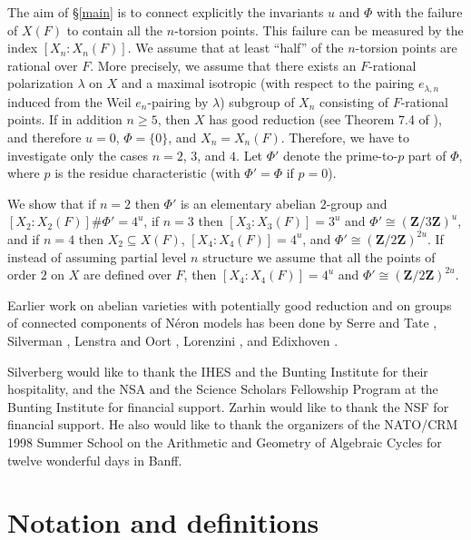 \documentclass{amsart}
\def\Z{{\mathbf Z}}
\theoremstyle{definition}
\begin{document}
The aim of \S\ref{main} is to connect explicitly the invariants 
$u$ and $\Phi$ with the failure of $X(F)$ to contain all the 
$n$-torsion points. This failure can be
measured by the index $[X_n:X_n(F)]$. We assume that at 
least ``half'' of the
$n$-torsion points are rational over $F$. More precisely, we assume that 
there exists an $F$-rational polarization $\lambda$ on $X$ 
and a maximal isotropic 
(with respect to the pairing $e_{\lambda,n}$ induced from the 
Weil $e_n$-pairing by $\lambda$) 
subgroup of $X_n$ consisting of $F$-rational points.
If in addition $n \ge 5$, then $X$ has good reduction (see Theorem 7.4 
of \cite{semistab}), and therefore $u = 0$, $\Phi=\{0\}$, and $X_n=X_n(F)$. 
Therefore, we have to investigate only the cases $n = 2$, $3$, and $4$.
Let $\Phi'$ denote the prime-to-$p$ part of $\Phi$, where $p$ is the
residue characteristic (with $\Phi ' = \Phi$ if $p = 0$). 

We show that if $n = 2$ then $\Phi'$ is an elementary abelian
$2$-group and  $[X_2:X_2(F)]\#\Phi' = 4^{u}$, 
if $n = 3$ then $[X_3:X_3(F)] = 3^{u}$ and
$\Phi' \cong (\Z/3\Z)^u$, and
if $n = 4$ then $X_2 \subseteq X(F)$,
$[X_4:X_4(F)] = 4^{u}$, and $\Phi' \cong (\Z/2\Z)^{2u}$.
If instead of assuming partial level $n$ structure we assume that 
all the points of order $2$ on $X$ are defined over $F$, then
$[X_4:X_4(F)]=4^u$ and $\Phi' \cong (\Z/2\Z)^{2u}$. 

Earlier work on abelian varieties with potentially good reduction and
on groups of connected components of N\'eron models 
has been done by Serre and Tate \cite{Serre-Tate},
Silverman \cite{Silverman},
Lenstra and Oort \cite{LenstraOort}, 
Lorenzini \cite{Lorenzini}, and Edixhoven \cite{Edixhoven}. 

Silverberg would like to thank the IHES and the Bunting
Institute for their hospitality, and the NSA and the Science Scholars
Fellowship Program at the Bunting Institute for financial support.
Zarhin would like to thank the NSF for financial support. 
He also would like to thank the organizers of the 
NATO/CRM 1998 Summer School 
on the Arithmetic and Geometry of Algebraic Cycles for 
twelve wonderful days in Banff.

\section{Notation and definitions}
\end{document}
